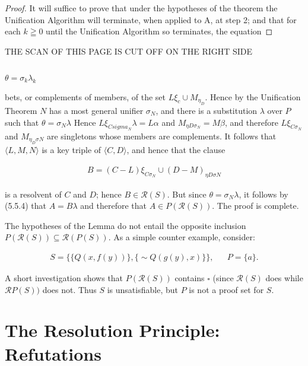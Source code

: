 \documentclass[8pt]{extarticle}
\begin{document}
\begin{proof}
It will suffice to prove that under the hypotheses of the theorem the
Unification Algorithm will terminate, when applied to A, at step 2; and that
for each $k \geqq 0$  until the Unification Algorithm so terminates, the equation
\end{proof}

\newpage

THE SCAN OF THIS PAGE IS CUT OFF ON THE RIGHT SIDE

\subsection{}
$\theta = \sigma_k\lambda_k$

\newpage
\noindent
bets, or complements of members, of the set $L\xi_c \cup M_{\eta_D}$. Hence by the Unification Theorem $N$ has a most general unifier $\sigma_N$, and there is a substitution $\lambda$ over $P$ such that $\theta = \sigma_N\lambda$ Hence $L\xi_{C sigma_N}\lambda = L\alpha$ and $M_{\eta D\sigma_N} = M\beta$, and therefore $L\xi_{C\sigma_N}$ and $M_{\eta_D\sigma N}$ are singletons whose members are complements. It follows that $\langle L, M, N\rangle$ is a key triple of $\langle C, D\rangle$, and hence that the clause

\begin{align*}
    B = (C - L)\xi_{C\sigma_N} \cup (D - M)_{\eta D\sigma N}
\end{align*}

is a resolvent of $C$ and $D$; hence $B \in \mathscr{R}(S)$. But since $\theta = \sigma_N\lambda$, it follows by (5.5.4) that $A = B\lambda$ and therefore that $A \in P(\mathscr{R}(S))$. The proof is complete.

The hypotheses of the Lemma do not entail the opposite inclusion $P(\mathscr{R}(S)) \subseteq \mathscr{R}(P(S))$. As a simple counter example, consider:

\begin{align*}
    S = \{\{Q(x,f(y))\},\{\sim Q(g(y),x)\}\}, && P = \{a\}.
\end{align*}

A short investigation shows that $P(\mathscr{R}(S))$ contains $\square$ (since $\mathscr{R}(S)$ does while $\mathscr{R}P(S))$ does not. Thus $S$ is unsatisfiable, but $P$ is not a proof set for $S$.

\section{The Resolution Principle: Refutations}
\end{document}
